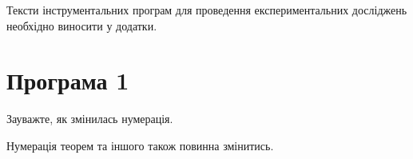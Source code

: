 \label{appendix:A}

Тексти інструментальних програм для проведення експериментальних досліджень необхідно
виносити у додатки.

\section{Програма 1}

Зауважте, як змінилась нумерація.

\begin{theorem}
Нумерація теорем та іншого також повинна змінитись.
\end{theorem}
